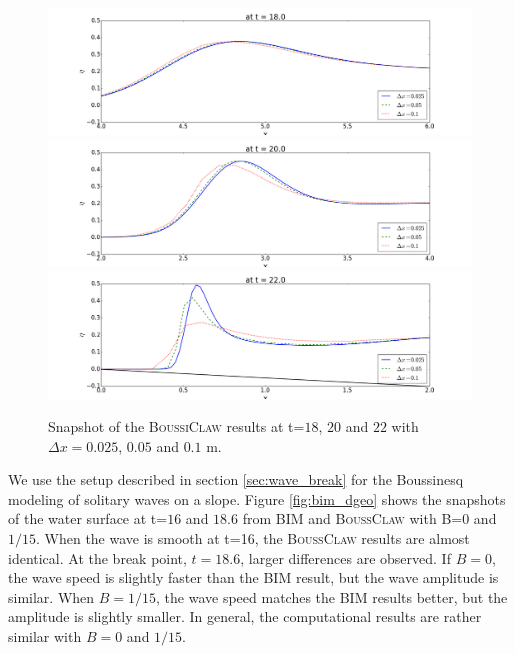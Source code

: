 \documentclass[review]{elsarticle}
\begin{document}
\begin{figure}[!htb]
\centering
\includegraphics[width=.9\textwidth]{_fig/dgeo_grids_t18.png}\\
\includegraphics[width=.9\textwidth]{_fig/dgeo_grids_t20.png}\\
\includegraphics[width=.9\textwidth]{_fig/dgeo_grids_t22.png}
\caption{Snapshot of the \textsc{BoussiClaw} results 
at t=$18$, $20$ and $22$
with $\Delta x=0.025$, $0.05$ and $0.1$ m.}
\label{fig:dgeo_grids}
\end{figure}

\fi

We use the setup described in section \ref{sec:wave_break} for the Boussinesq modeling of
solitary waves on a slope. Figure \ref{fig:bim_dgeo} shows the snapshots of 
the water surface at t=$16$ and $18.6$
from BIM and \textsc{BoussClaw} with B=$0$ and $1/15$.
When the wave is smooth at t=16, the \textsc{BoussClaw}
results are almost identical. 
At the break point, $t=18.6$, larger differences are observed. 
If $B=0$, the wave speed is slightly faster 
than the BIM result, but the wave amplitude is similar. 
When $B=1/15$, the wave speed matches the BIM results better,
but the amplitude is slightly smaller. 
In general, the computational results are rather similar
with $B=0$ and $1/15$. 
\end{document}
